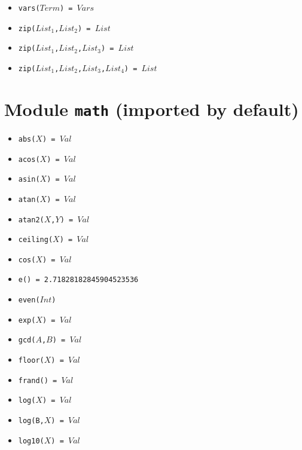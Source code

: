 \documentclass[10pt]{article}
\begin{document}
\begin{multicols}{2}
\begin{scriptsize}
\begin{itemize}
    \item \texttt{vars($Term$) = $Vars$}
    \item \texttt{zip($List_1$,$List_2$) = $List$} 
    \item \texttt{zip($List_1$,$List_2$,$List_3$) = $List$} 
    \item \texttt{zip($List_1$,$List_2$,$List_3$,$List_4$) = $List$} 
\end{itemize}
\end{scriptsize}

%
\section*{Module \texttt{math} (imported by default)}
\begin{scriptsize}
\begin{itemize}
   \item \texttt{abs($X$) = $Val$} 
   \item \texttt{acos($X$) = $Val$} 
   \item \texttt{asin($X$) = $Val$}
   \item \texttt{atan($X$) = $Val$}
   \item \texttt{atan2($X$,$Y$) = $Val$}
   \item \texttt{ceiling($X$) = $Val$} 
   \item \texttt{cos($X$) = $Val$} 
   \item \texttt{e() = 2.71828182845904523536} 
   \item \texttt{even($Int$)} 
   \item \texttt{exp($X$) = $Val$} 
   \item \texttt{gcd($A$,$B$) = $Val$} 
   \item \texttt{floor($X$) = $Val$} 
   \item \texttt{frand() = $Val$} 
   \item \texttt{log($X$) = $Val$}
   \item \texttt{log(B,$X$) = $Val$} 
   \item \texttt{log10($X$) = $Val$} 

\end{itemize}
\end{scriptsize}
\end{multicols}
\end{document}
